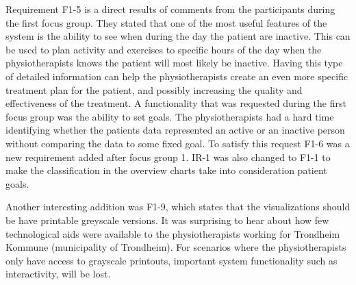 Requirement F1-5 is a direct results of comments from the participants during the first focus group. They stated that one of the most useful features of the system is the ability to see when during the day the patient are inactive. This can be used to plan activity and exercises to specific hours of the day when the physiotherapists knows the patient will most likely be inactive. Having this type of detailed information can help the physiotherapists create an even more specific treatment plan for the patient, and possibly increasing the quality and effectiveness of the treatment. A functionality that was requested during the first focus group was the ability to set goals. The physiotherapists had a hard time identifying whether the patients data represented an active or an inactive person without comparing the data to some fixed goal. To satisfy this request F1-6 was a new requirement added after focus group 1. IR-1 was also changed to F1-1 to make the classification in the overview charts take into consideration patient goals. %

Another interesting addition was F1-9, which states that the visualizations should be have printable greyscale versions. It was surprising to hear about how few technological aids were available to the physiotherapists working for Trondheim Kommune (municipality of Trondheim). For scenarios where the physiotherapists only have access to grayscale printouts, important system functionality such as interactivity, will be lost.

